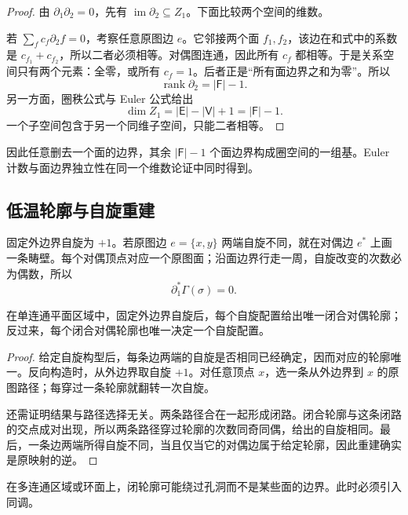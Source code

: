 \begin{proof}
由 \(\partial_1\partial_2=0\)，先有
\(\operatorname{im}\partial_2\subseteq Z_1\)。下面比较两个空间的维数。

若 \(\sum_fc_f\partial_2f=0\)，考察任意原图边 \(e\)。它邻接两个面 \(f_1,f_2\)，该边在和式中的系数是
\(c_{f_1}+c_{f_2}\)，所以二者必须相等。对偶图连通，因此所有 \(c_f\) 都相等。于是关系空间只有两个元素：全零，或所有 \(c_f=1\)。后者正是“所有面边界之和为零”。所以
\[
\operatorname{rank}\partial_2=|\mathsf F|-1.
\]
另一方面，圈秩公式与 Euler 公式给出
\[
\dim Z_1=|\mathsf E|-|\mathsf V|+1=|\mathsf F|-1.
\]
一个子空间包含于另一个同维子空间，只能二者相等。
\end{proof}

因此任意删去一个面的边界，其余
\(|\mathsf F|-1\) 个面边界构成圈空间的一组基。Euler 计数与面边界独立性在同一个维数论证中同时得到。

\subsection{低温轮廓与自旋重建}
\label{sec:phys-sm-contours}

固定外边界自旋为 \(+1\)。若原图边 \(e=\{x,y\}\) 两端自旋不同，就在对偶边 \(e^*\) 上画一条畴壁。每个对偶顶点对应一个原图面；沿面边界行走一周，自旋改变的次数必为偶数，所以
\begin{equation}
\partial_1^*\Gamma(\sigma)=0.
\label{eq:phys-sm-domain-wall-even}
\end{equation}

\begin{theorem}[固定边界下自旋与闭轮廓一一对应]
\label{thm:phys-sm-spin-contour-bijection}
在单连通平面区域中，固定外边界自旋后，每个自旋配置给出唯一闭合对偶轮廓；反过来，每个闭合对偶轮廓也唯一决定一个自旋配置。
\end{theorem}

\begin{proof}
给定自旋构型后，每条边两端的自旋是否相同已经确定，因而对应的轮廓唯一。反向构造时，从外边界取自旋 \(+1\)。对任意顶点 \(x\)，选一条从外边界到 \(x\) 的原图路径；每穿过一条轮廓就翻转一次自旋。

还需证明结果与路径选择无关。两条路径合在一起形成闭路。闭合轮廓与这条闭路的交点成对出现，所以两条路径穿过轮廓的次数同奇同偶，给出的自旋相同。最后，一条边两端所得自旋不同，当且仅当它的对偶边属于给定轮廓，因此重建确实是原映射的逆。
\end{proof}

在多连通区域或环面上，闭轮廓可能绕过孔洞而不是某些面的边界。此时必须引入同调。

